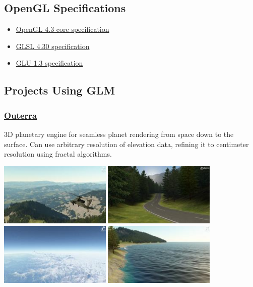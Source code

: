 \documentclass{scrartcl}
\numberwithin{figure}{subsection}
\begin{document}
\subsection{OpenGL Specifications}

\begin{itemize}
  \item \href{http://www.opengl.org/registry/doc/glspec43.core.20120806.withchanges.pdf}{OpenGL 4.3 core specification}
  \item \href{http://www.opengl.org/registry/doc/GLSLangSpec.4.30.7.diff.pdf}{GLSL 4.30 specification}
  \item \href{http://www.opengl.org/documentation/specs/glu/glu1_3.pdf}{GLU 1.3 specification}
\end{itemize}

\subsection{Projects Using GLM}

\subsubsection{\href{http://outerra.com/}{Outerra}}

3D planetary engine for seamless planet rendering from space down to the surface. Can use arbitrary resolution of elevation data, refining it to centimeter resolution using fractal algorithms.

\begin{center}
  \includegraphics[width=0.4\textwidth]{outerra1}
  \includegraphics[width=0.4\textwidth]{outerra2}
  \includegraphics[width=0.4\textwidth]{outerra3}
  \includegraphics[width=0.4\textwidth]{outerra4}
\end{center}
\end{document}
